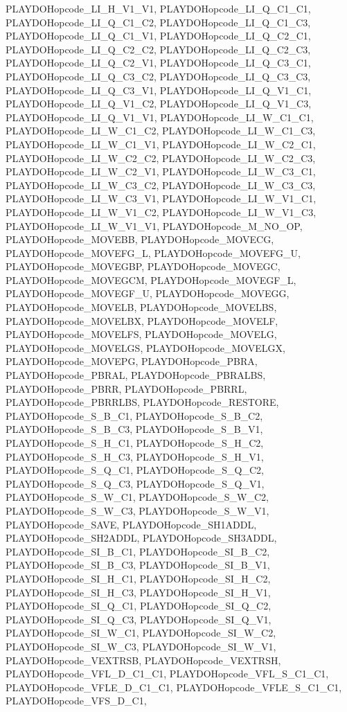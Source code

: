 PLAYDOHopcode\_\-LI\_\-H\_\-V1\_\-V1, PLAYDOHopcode\_\-LI\_\-Q\_\-C1\_\-C1, PLAYDOHopcode\_\-LI\_\-Q\_\-C1\_\-C2, PLAYDOHopcode\_\-LI\_\-Q\_\-C1\_\-C3, PLAYDOHopcode\_\-LI\_\-Q\_\-C1\_\-V1, PLAYDOHopcode\_\-LI\_\-Q\_\-C2\_\-C1, PLAYDOHopcode\_\-LI\_\-Q\_\-C2\_\-C2, PLAYDOHopcode\_\-LI\_\-Q\_\-C2\_\-C3, PLAYDOHopcode\_\-LI\_\-Q\_\-C2\_\-V1, PLAYDOHopcode\_\-LI\_\-Q\_\-C3\_\-C1, PLAYDOHopcode\_\-LI\_\-Q\_\-C3\_\-C2, PLAYDOHopcode\_\-LI\_\-Q\_\-C3\_\-C3, PLAYDOHopcode\_\-LI\_\-Q\_\-C3\_\-V1, PLAYDOHopcode\_\-LI\_\-Q\_\-V1\_\-C1, PLAYDOHopcode\_\-LI\_\-Q\_\-V1\_\-C2, PLAYDOHopcode\_\-LI\_\-Q\_\-V1\_\-C3, PLAYDOHopcode\_\-LI\_\-Q\_\-V1\_\-V1, PLAYDOHopcode\_\-LI\_\-W\_\-C1\_\-C1, PLAYDOHopcode\_\-LI\_\-W\_\-C1\_\-C2, PLAYDOHopcode\_\-LI\_\-W\_\-C1\_\-C3, PLAYDOHopcode\_\-LI\_\-W\_\-C1\_\-V1, PLAYDOHopcode\_\-LI\_\-W\_\-C2\_\-C1, PLAYDOHopcode\_\-LI\_\-W\_\-C2\_\-C2, PLAYDOHopcode\_\-LI\_\-W\_\-C2\_\-C3, PLAYDOHopcode\_\-LI\_\-W\_\-C2\_\-V1, PLAYDOHopcode\_\-LI\_\-W\_\-C3\_\-C1, PLAYDOHopcode\_\-LI\_\-W\_\-C3\_\-C2, PLAYDOHopcode\_\-LI\_\-W\_\-C3\_\-C3, PLAYDOHopcode\_\-LI\_\-W\_\-C3\_\-V1, PLAYDOHopcode\_\-LI\_\-W\_\-V1\_\-C1, PLAYDOHopcode\_\-LI\_\-W\_\-V1\_\-C2, PLAYDOHopcode\_\-LI\_\-W\_\-V1\_\-C3, PLAYDOHopcode\_\-LI\_\-W\_\-V1\_\-V1, PLAYDOHopcode\_\-M\_\-NO\_\-OP, PLAYDOHopcode\_\-MOVEBB, PLAYDOHopcode\_\-MOVECG, PLAYDOHopcode\_\-MOVEFG\_\-L, PLAYDOHopcode\_\-MOVEFG\_\-U, PLAYDOHopcode\_\-MOVEGBP, PLAYDOHopcode\_\-MOVEGC, PLAYDOHopcode\_\-MOVEGCM, PLAYDOHopcode\_\-MOVEGF\_\-L, PLAYDOHopcode\_\-MOVEGF\_\-U, PLAYDOHopcode\_\-MOVEGG, PLAYDOHopcode\_\-MOVELB, PLAYDOHopcode\_\-MOVELBS, PLAYDOHopcode\_\-MOVELBX, PLAYDOHopcode\_\-MOVELF, PLAYDOHopcode\_\-MOVELFS, PLAYDOHopcode\_\-MOVELG, PLAYDOHopcode\_\-MOVELGS, PLAYDOHopcode\_\-MOVELGX, PLAYDOHopcode\_\-MOVEPG, PLAYDOHopcode\_\-PBRA, PLAYDOHopcode\_\-PBRAL, PLAYDOHopcode\_\-PBRALBS, PLAYDOHopcode\_\-PBRR, PLAYDOHopcode\_\-PBRRL, PLAYDOHopcode\_\-PBRRLBS, PLAYDOHopcode\_\-RESTORE, PLAYDOHopcode\_\-S\_\-B\_\-C1, PLAYDOHopcode\_\-S\_\-B\_\-C2, PLAYDOHopcode\_\-S\_\-B\_\-C3, PLAYDOHopcode\_\-S\_\-B\_\-V1, PLAYDOHopcode\_\-S\_\-H\_\-C1, PLAYDOHopcode\_\-S\_\-H\_\-C2, PLAYDOHopcode\_\-S\_\-H\_\-C3, PLAYDOHopcode\_\-S\_\-H\_\-V1, PLAYDOHopcode\_\-S\_\-Q\_\-C1, PLAYDOHopcode\_\-S\_\-Q\_\-C2, PLAYDOHopcode\_\-S\_\-Q\_\-C3, PLAYDOHopcode\_\-S\_\-Q\_\-V1, PLAYDOHopcode\_\-S\_\-W\_\-C1, PLAYDOHopcode\_\-S\_\-W\_\-C2, PLAYDOHopcode\_\-S\_\-W\_\-C3, PLAYDOHopcode\_\-S\_\-W\_\-V1, PLAYDOHopcode\_\-SAVE, PLAYDOHopcode\_\-SH1ADDL, PLAYDOHopcode\_\-SH2ADDL, PLAYDOHopcode\_\-SH3ADDL, PLAYDOHopcode\_\-SI\_\-B\_\-C1, PLAYDOHopcode\_\-SI\_\-B\_\-C2, PLAYDOHopcode\_\-SI\_\-B\_\-C3, PLAYDOHopcode\_\-SI\_\-B\_\-V1, PLAYDOHopcode\_\-SI\_\-H\_\-C1, PLAYDOHopcode\_\-SI\_\-H\_\-C2, PLAYDOHopcode\_\-SI\_\-H\_\-C3, PLAYDOHopcode\_\-SI\_\-H\_\-V1, PLAYDOHopcode\_\-SI\_\-Q\_\-C1, PLAYDOHopcode\_\-SI\_\-Q\_\-C2, PLAYDOHopcode\_\-SI\_\-Q\_\-C3, PLAYDOHopcode\_\-SI\_\-Q\_\-V1, PLAYDOHopcode\_\-SI\_\-W\_\-C1, PLAYDOHopcode\_\-SI\_\-W\_\-C2, PLAYDOHopcode\_\-SI\_\-W\_\-C3, PLAYDOHopcode\_\-SI\_\-W\_\-V1, PLAYDOHopcode\_\-VEXTRSB, PLAYDOHopcode\_\-VEXTRSH, PLAYDOHopcode\_\-VFL\_\-D\_\-C1\_\-C1, PLAYDOHopcode\_\-VFL\_\-S\_\-C1\_\-C1, PLAYDOHopcode\_\-VFLE\_\-D\_\-C1\_\-C1, PLAYDOHopcode\_\-VFLE\_\-S\_\-C1\_\-C1, PLAYDOHopcode\_\-VFS\_\-D\_\-C1, 